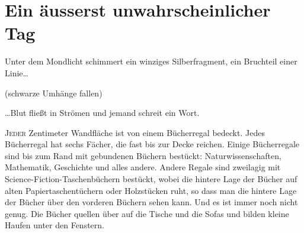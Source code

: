\chapter[Ein äußerst unwahrscheinlicher Tag]{Ein äusserst unwahrscheinlicher Tag}

\begin{chapterOpeningQuote}
\noindent
Unter dem Mondlicht schimmert ein winziges Silberfragment, ein Bruchteil einer Linie…

\vspace*{2ex}
(schwarze Umhänge fallen)

\vspace*{2ex}
…Blut fließt in Strömen und jemand schreit ein Wort.
\end{chapterOpeningQuote}

\lettrine{J}{eder} Zentimeter Wandfläche ist von einem Bücherregal bedeckt. Jedes Bücherregal hat sechs Fächer, die fast bis zur Decke reichen. Einige Bücherregale sind bis zum Rand mit gebundenen Büchern bestückt: Naturwissenschaften, Mathematik, Geschichte und alles andere. Andere Regale sind zweilagig mit Science-Fiction-Taschenbüchern bestückt, wobei die hintere Lage der Bücher auf alten Papiertaschentüchern oder Holzstücken ruht, so dass man die hintere Lage der Bücher über den vorderen Büchern sehen kann. Und es ist immer noch nicht genug. Die Bücher quellen über auf die Tische und die Sofas und bilden kleine Haufen unter den Fenstern.

